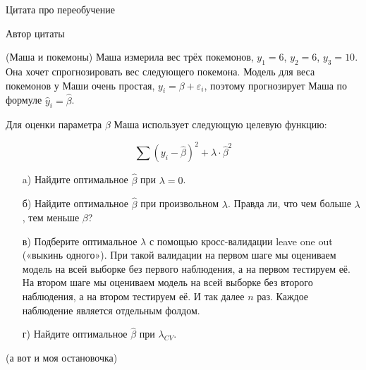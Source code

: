 \epigraph{Цитата про переобучение}{Автор цитаты}


\begin{problem}{(Маша и покемоны)}
 Маша измерила вес трёх покемонов,  $y_1=6$, $y_2=6$, $y_3=10$.  Она хочет спрогнозировать вес следующего покемона. Модель для веса покемонов у Маши очень простая, $y_i = \beta + \varepsilon_i$, поэтому прогнозирует Маша по формуле $\hat y_i = \hat \beta$.
	
	Для оценки параметра $\beta$ Маша использует следующую целевую функцию:
	
	$$
	\sum (y_i - \hat \beta)^2 + \lambda \cdot \hat \beta^2
	$$
	
	\begin{enumerate}
		\item[a)] Найдите оптимальное $\hat \beta$ при $\lambda =0$.
		\item[б)] Найдите оптимальное $\hat \beta$ при произвольном $\lambda$. Правда ли, что чем больше $\lambda$, тем меньше $\beta$? 
		\item[в)] Подберите оптимальное $\lambda$ с помощью кросс-валидации leave one out («выкинь одного»). При такой валидации на первом шаге мы оцениваем модель на всей выборке без первого наблюдения, а на первом тестируем её. На втором шаге мы оцениваем модель на всей выборке без второго наблюдения, а на втором тестируем её. И так далее $n$ раз. Каждое наблюдение является отдельным фолдом.
		\item[г)] Найдите оптимальное $\hat \beta$ при $\lambda_{CV}$.
	\end{enumerate}
\end{problem}


\begin{problem}{(а вот и моя остановочка)}
\end{problem}


